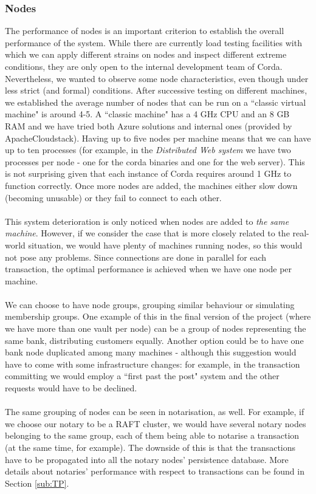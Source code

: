 \documentclass[12pt,twoside]{article}
\begin{document}
\subsubsection{Nodes}
The performance of nodes is an important criterion to establish the overall performance of the system. While there are currently load testing facilities with which we can apply different strains on nodes and inspect different extreme conditions, they are only open to the internal development team of Corda. Nevertheless, we wanted to observe some node characteristics, even though under less strict (and formal) conditions. After successive testing on different machines, we established the average number of nodes that can be run on a ``classic virtual machine" is around 4-5. A ``classic machine" has a 4 GHz CPU and an 8 GB RAM and we have tried both Azure solutions and internal ones (provided by ApacheCloudstack). Having up to five nodes per machine means that we can have up to ten processes (for example, in the \textit{Distributed Web system} we have two processes per node - one for the corda binaries and one for the web server). This is not surprising given that each instance of Corda requires around 1 GHz to function correctly. Once more nodes are added, the machines either slow down (becoming unusable) or they fail to connect to each other.
\\ \\
This system deterioration is only noticed when nodes are added to \textit{the same machine}. However, if we consider the case that is more closely related to the real-world situation, we would have plenty of machines running nodes, so this would not pose any problems. Since connections are done in parallel for each transaction, the optimal performance is achieved when we have one node per machine.
\\ \\
We can choose to have node groups, grouping similar behaviour or simulating membership groups. One example of this in the final version of the project (where we have more than one vault per node) can be a group of nodes representing the same bank, distributing customers equally. Another option could be to have one bank node duplicated among many machines - although this suggestion would have to come with some infrastructure changes: for example, in the transaction committing we would employ a ``first past the post" system and the other requests would have to be declined. 
\\ \\
The same grouping of nodes can be seen in notarisation, as well. For example, if we choose our notary to be a RAFT cluster, we would have several notary nodes belonging to the same group, each of them being able to notarise a transaction (at the same time, for example). The downside of this is that the transactions have to be propagated into all the notary nodes' persistence database. More details about notaries' performance with respect to transactions can be found in Section \ref{sub:TP}.
\end{document}
